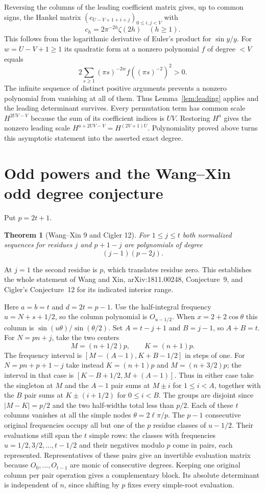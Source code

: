 \documentclass[11pt,a4paper]{article}
\newtheorem{theorem}{Theorem}[section]\newtheorem{lemma}[theorem]{Lemma}
\theoremstyle{definition}\newtheorem{problem}[theorem]{Auxiliary problem}
\theoremstyle{remark}\newtheorem*{remark}{Remark}
\begin{document}
Reversing the columns of the leading coefficient matrix gives, up to common signs, the Hankel matrix $(c_{U-V+1+i+j})_{0\le i,j<V}$ with
\[
 c_h=2\pi^{-2h}\zeta(2h)\quad(h\ge1).
\]
This follows from the logarithmic derivative of Euler's product for $\sin y/y$. For $w=U-V+1\ge1$ its quadratic form at a nonzero polynomial $f$ of degree $<V$ equals
\[
 2\sum_{s\ge1}(\pi s)^{-2w} f((\pi s)^{-2})^2>0.
\]
The infinite sequence of distinct positive arguments prevents a nonzero polynomial from vanishing at all of them. Thus Lemma~\ref{lem:leading} applies and the leading determinant survives. Every permutation term has common scale $H^{2UV-V}$ because the sum of its coefficient indices is $UV$. Restoring $H^a$ gives the nonzero leading scale $H^{a+2UV-V}=H^{(2V+1)U}$. Polynomiality proved above turns this asymptotic statement into the asserted exact degree.

\section{Odd powers and the Wang--Xin odd degree conjecture}
Put $p=2t+1$. \begin{theorem}[Wang--Xin 9 and Cigler 12]\label{result:odd} For $1\le j\le t$ both normalized sequences for residues $j$ and $p+1-j$ are polynomials of degree
\[
 (j-1)(p-2j).
\]
\end{theorem} At $j=1$ the second residue is $p$, which translates residue zero. This establishes the whole statement of Wang and Xin, arXiv:1811.00248, Conjecture~9, and Cigler's Conjecture~12 for its indicated interior range.

Here $a=b=t$ and $d=2t=p-1$. Use the half-integral frequency $u=N+s+1/2$, so the column polynomial is $O_{u-1/2}$. When $x=2+2\cos\theta$ this column is $\sin(u\theta)/\sin(\theta/2)$. Set $A=t-j+1$ and $B=j-1$, so $A+B=t$. For $N=pn+j$, take the two centers
\[
 M=(n+1/2)p,\qquad K=(n+1)p .
\]
The frequency interval is $[M-(A-1),K+B-1/2]$ in steps of one. For $N=pn+p+1-j$ take instead $K=(n+1)p$ and $M=(n+3/2)p$; the interval in that case is $[K-B+1/2,M+(A-1)]$. Thus in either case take the singleton at $M$ and the $A-1$ pair sums at $M\pm i$ for $1\le i<A$, together with the $B$ pair sums at $K\pm(i+1/2)$ for $0\le i<B$. The groups are disjoint since $|M-K|=p/2$ and the two half-widths total less than $p/2$. Each of these $t$ columns vanishes at all the simple nodes $\theta=2\ell\pi/p$. The $p-1$ consecutive original frequencies occupy all but one of the $p$ residue classes of $u-1/2$. Their evaluations still span the $t$ simple rows: the classes with frequencies $u=1/2,3/2,\ldots,t-1/2$ and their negatives modulo $p$ come in pairs, each represented. Representatives of these pairs give an invertible evaluation matrix because $O_0,\ldots,O_{t-1}$ are monic of consecutive degrees. Keeping one original column per pair operation gives a complementary block. Its absolute determinant is independent of $n$, since shifting by $p$ fixes every simple-root evaluation.
\end{document}
